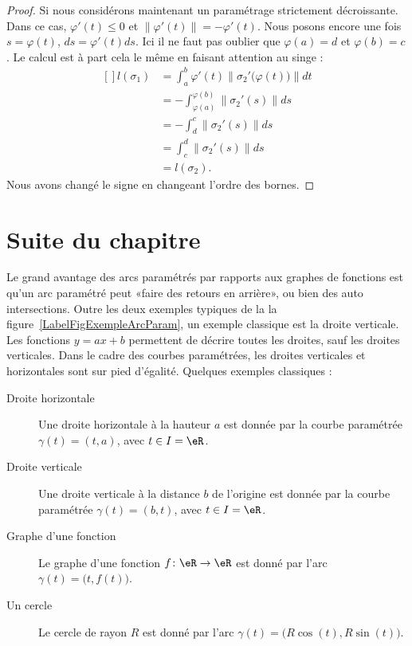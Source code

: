 \begin{proof}
	Si nous considérons maintenant un paramétrage strictement décroissante. Dans ce cas, \( \varphi'(t)\leq 0\) et \( \| \varphi'(t) \|=-\varphi'(t)\). Nous posons encore une fois \( s=\varphi(t)\), \( ds=\varphi'(t)ds\). Ici il ne faut pas oublier que \( \varphi(a)=d\) et \( \varphi(b)=c\). Le calcul est à part cela le même en faisant attention au singe :
	\begin{equation}
		\begin{aligned}[]
			l(\sigma_1) & =\int_a^b\varphi'(t)\| \sigma_2'\big( \varphi(t) \big) \|dt \\
			            & =-\int_{\varphi(a)}^{\varphi(b)}\| \sigma_2'(s) \|ds        \\
			            & =-\int_d^c\| \sigma_2'(s) \|ds                              \\
			            & =\int_c^d\| \sigma_2'(s) \|ds                               \\
			            & =l(\sigma_2).
		\end{aligned}
	\end{equation}
	Nous avons changé le signe en changeant l'ordre des bornes.
\end{proof}

\section{Suite du chapitre}

Le grand avantage des arcs paramétrés par rapports aux graphes de fonctions est qu'un arc paramétré peut «faire des retours en arrière», ou bien des auto intersections. Outre les deux exemples typiques de la la figure~\ref{LabelFigExempleArcParam}, un exemple classique est la droite verticale. Les fonctions \( y=ax+b\) permettent de décrire toutes les droites, sauf les droites verticales. Dans le cadre des courbes paramétrées, les droites verticales et horizontales sont sur pied d'égalité. Quelques exemples classiques :
\begin{description}
	\item[Droite horizontale] Une droite horizontale à la hauteur \( a\) est donnée par la courbe paramétrée \( \gamma(t)=(t,a)\), avec \( t\in I=\eR\).
	\item[Droite verticale] Une droite verticale à la distance \( b\) de l'origine est donnée par la courbe paramétrée \( \gamma(t)=(b,t)\), avec \( t\in I=\eR\).
	\item[Graphe d'une fonction]\label{PgGrqFnGamma} Le graphe d'une fonction \( f\colon \eR\to \eR\) est donné par l'arc \( \gamma(t)=\big( t,f(t) \big)\).
	\item[Un cercle] Le cercle de rayon \( R\) est donné par l'arc \( \gamma(t)=\big( R\cos(t),R\sin(t) \big)\).
\end{description}


